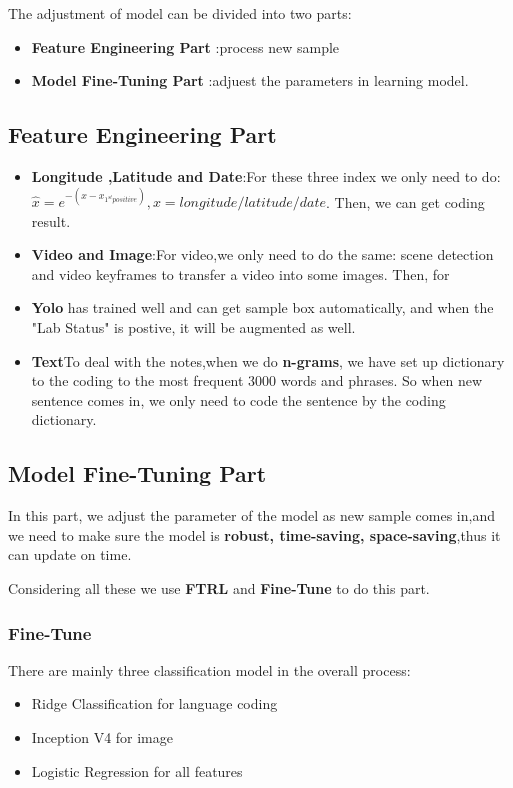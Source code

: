 \documentclass[12pt]{article}
\begin{document}
The adjustment of model can be divided into two parts:
\begin{itemize}
	\item \textbf{Feature Engineering Part} :process new sample
	\item \textbf{Model Fine-Tuning Part} :adjuest the parameters in learning model.
\end{itemize}
\subsection{Feature Engineering Part}
\begin{itemize}
	\item \textbf{Longitude ,Latitude and Date}:For these three index we only need to do: $\hat{x}=e^{-(x-x_{1^{st}positive})},x=longitude/latitude/date$. Then, we can get coding result.
	\item \textbf{Video and Image}:For video,we only need to do the same: scene detection and video keyframes to transfer a video into some images. Then, for
	\item \textbf{Yolo} has trained well and can get sample box automatically, and when the "Lab Status" is postive, it will be augmented as well.
	\item \textbf{Text}To deal with the notes,when we do \textbf{n-grams}, we have set up dictionary to the coding to the most frequent 3000 words and phrases. So when new sentence comes in, we only need to code the sentence by the coding dictionary.
\end{itemize}


\subsection{Model Fine-Tuning Part}
In this part, we adjust the parameter of the model as new sample comes in,and we need to make sure the model is \textbf{robust, time-saving, space-saving},thus it can update on time.

Considering all these we use \textbf{FTRL} and \textbf{Fine-Tune} to do this part.
 
\subsubsection{Fine-Tune}
There are mainly three classification model in the overall process:
\begin{itemize}
	\item Ridge Classification for language coding
	\item Inception V4 for image
	\item Logistic Regression for all features
\end{itemize}
\end{document}
